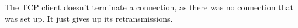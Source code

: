 The TCP client doesn't terminate a connection, as there was no connection that was set up. It just gives up its retransmissions.